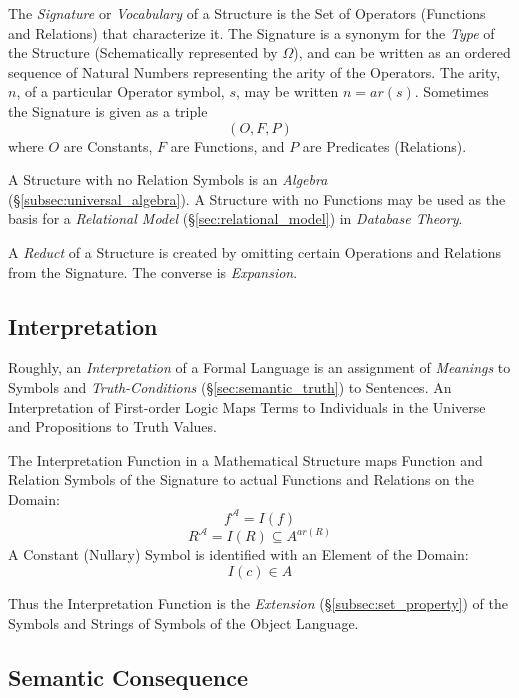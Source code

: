 \documentclass{article}
\begin{document}
The \emph{Signature} or \emph{Vocabulary} of a Structure is the Set of
Operators (Functions and Relations) that characterize it. The
Signature is a synonym for the \emph{Type} of the Structure
(Schematically represented by $\Omega$), and can be written as an
ordered sequence of Natural Numbers representing the arity of the
Operators. The arity, $n$, of a particular Operator symbol, $s$, may
be written $n=ar(s)$. Sometimes the Signature is given as a triple
\[
    (O,F,P)
\]
where $O$ are Constants, $F$ are Functions, and $P$ are Predicates
(Relations).

A Structure with no Relation Symbols is an \emph{Algebra}
(\S\ref{subsec:universal_algebra}). A Structure with no Functions may
be used as the basis for a \emph{Relational Model}
(\S\ref{sec:relational_model}) in \emph{Database Theory}.

A \emph{Reduct} of a Structure is created by omitting certain
Operations and Relations from the Signature. The converse is
\emph{Expansion}.



\subsection{Interpretation}\label{subsec:interpretation}

Roughly, an \emph{Interpretation} of a Formal Language is an
assignment of \emph{Meanings} to Symbols and \emph{Truth-Conditions}
(\S\ref{sec:semantic_truth}) to Sentences. An Interpretation of
First-order Logic Maps Terms to Individuals in the Universe and
Propositions to Truth Values.

The Interpretation Function in a Mathematical Structure maps Function
and Relation Symbols of the Signature to actual Functions and
Relations on the Domain:
\[
    f^{\mathcal{A}} = I (f)
\]
\[
    R^{\mathcal{A}} = I (R) \subseteq A^{ar(R)}
\]
A Constant (Nullary) Symbol is identified with an Element of the
Domain:
\[
    I(c) \in A
\]

Thus the Interpretation Function is the \emph{Extension}
(\S\ref{subsec:set_property}) of the Symbols and Strings of Symbols of
the Object Language.



\subsection{Semantic Consequence}\label{subsec:semantic_consequence}
\end{document}
